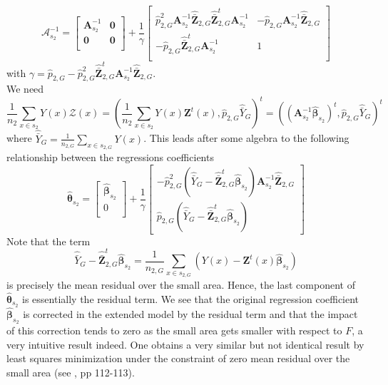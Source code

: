 \documentclass[a4paper,12pt,leqno, titlepage]{article}
\begin{document}
\begin{equation}\label{inversetildeAs2}
 \pmb{\mathcal{A}}^{-1}_{s_2}=
\left[ \begin {array}{ll}
\pmb{A}^{-1}_{s_2}& \pmb{0} \\
 \pmb{0} & \pmb{0} \\ \end {array} \right]
 + \frac{1}{\gamma}\left[ \begin {array}{ll}
\hat{p}_{2,G}^2\pmb{A}^{-1}_{s_2}\hat{\bar{\pmb{Z}}}_{2,G}\hat{\bar{\pmb{Z}}}^t_{2,G}\pmb{A}^{-1}_{s_2}
& - \hat{p}_{2,G}\pmb{A}^{-1}_{s_2}\hat{\bar{\pmb{Z}}}_{2,G}\\
 -\hat{p}_{2,G}\hat{\bar{\pmb{Z}}}^t_{2,G}\pmb{A}^{-1}_{s_2} & 1 \\ \end {array} \right]
\end{equation}
with $\gamma=\hat{p}_{2,G}-\hat{p}^2_{2,G}\hat{\bar{\pmb{Z}}}^t_{2,G}\pmb{A}^{-1}_{s_2}\hat{\bar{\pmb{Z}}}_{2,G}$.\\
We need
$$\frac{1}{n_2}\sum_{x\in{s_2}}Y(x)\pmb{\mathcal{Z}}(x)=
(\frac{1}{n_2}\sum_{x\in{s_2}}Y(x)\pmb{Z}^t(x),\hat{p}_{2,G}\hat{\bar{Y}}_G)^t
=((\pmb{A}^{-1}_{s_2}\hat{\pmb{\beta}}_{s_2})^t,\hat{p}_{2,G}\hat{\bar{Y}}_G)^t$$
where $\hat{\bar{Y}}_G=\frac{1}{n_{2,G}}\sum_{x\in{s_{2,G}}}Y(x)$. This leads after some algebra to the following relationship between the regressions coefficients
\begin{equation}\label{relationship}
 \hat{\pmb{\theta}}_{s_2}=
\left[ \begin {array}{l}
\hat{\pmb{\beta}}_{s_2} \\
 0 \\ \end {array} \right]
 + \frac{1}{\gamma}\left[ \begin {array}{l}
-\hat{p}_{2,G}^2(\hat{\bar{Y}}_G-\hat{\bar{\pmb{Z}}}^t_{2,G}\hat{\pmb{\beta}}_{s_2})\pmb{A}^{-1}_{s_2}\hat{\bar{\pmb{Z}}}_{2,G}
\\
 \hat{p}_{2,G}(\hat{\bar{Y}}_G-\hat{\bar{\pmb{Z}}}^t_{2,G}\hat{\pmb{\beta}}_{s_2})\end {array} \right]
\end{equation}
Note that the term
$$\hat{\bar{Y}}_G-\hat{\bar{\pmb{Z}}}^t_{2,G}\hat{\pmb{\beta}}_{s_2}=\frac{1}{n_{2,G}}
\sum_{x\in{s_{2,G}}}(Y(x)-\pmb{Z}^t(x)\hat{\pmb{\beta}}_{s_2})$$
is precisely the mean residual over the small area. Hence, the last component of $\hat{\pmb{\theta}}_{s_2}$ is essentially the residual term. We see that the original regression coefficient $\hat{\pmb{\beta}}_{s_2}$ is corrected in the extended model by the residual term and that the impact of this correction tends to zero as the small area gets smaller with respect to $F$, a very intuitive result indeed. One obtains a very similar but not identical result by least squares minimization under the constraint of zero mean residual over the small area (see \cite{searle}, pp 112-113).\\
\end{document}
